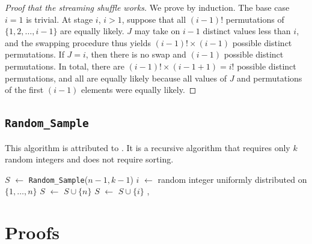 \documentclass[12pt]{article}
\newcommand*\Let[2]{\State #1 $\gets$ #2}
\newcommand{\todo}[1]{{\color{red}{TO DO: \sc #1}}}
\begin{document}
\begin{proof}[Proof that the streaming shuffle works]
We prove by induction. The base case $i=1$ is trivial.
At stage $i$, $i>1$, suppose that all $(i-1)!$ permutations of $\{1, 2, \dots, i-1\}$ are equally likely.
$J$ may take on $i-1$ distinct values less than $i$, and the swapping procedure thus yields $(i-1)! \times (i-1)$
possible distinct permutations.
If $J = i$, then there is no swap and $(i-1)$ possible distinct permutations.
In total, there are $(i-1)! \times (i-1 + 1) = i!$ possible distinct permutations, and all are equally likely because
all values of $J$ and permutations of the first $(i-1)$ elements were equally likely.
\end{proof}


\subsection{\texttt{Random\_Sample}}
This algorithm is attributed to \citet{cormen_introduction_2009}.
It is a recursive algorithm that requires only $k$ random integers and does not require sorting.
\todo{prove by recursion that the method works}


\begin{algorithm}                      %
\caption{$Random\_Sample$}
\label{Random_Sample}
\begin{algorithmic}[1]               %
\Statex
{}
\Else
     \Let{$S$}{\texttt{Random\_Sample}($n-1, k-1$)}
     \Let{$i$}{random integer uniformly distributed on $\{1, \dots, n\}$} 
           \Let{$S$}{$S \cup \{n\}$}
     \Else
            \Let{$S$}{$S\cup\{i\}$}  
     \EndIf, 
\EndIf
\EndFunction
\end{algorithmic}
\end{algorithm}

\section{Proofs}
\end{document}
